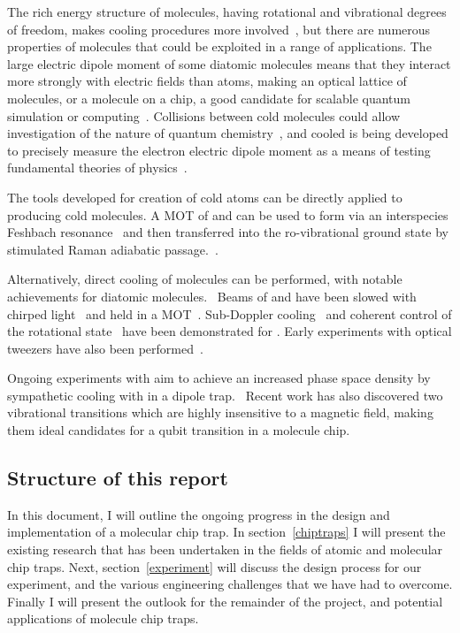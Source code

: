 The rich energy structure of molecules, having rotational and vibrational
degrees of freedom, makes cooling procedures more involved~\cite{Tarbutt2018},
but there are numerous properties of molecules that could be exploited in a
range of applications. The large electric dipole moment of some diatomic
molecules means that they interact more strongly with electric fields than
atoms, making an optical lattice of molecules, or a molecule on a chip, a good
candidate for scalable quantum simulation or computing~\cite{Micheli2006,
Andre2006}.  Collisions between cold molecules could allow investigation of the
nature of quantum chemistry~\cite{Krems2008}, and cooled \YbF{} is being
developed to precisely measure the electron electric dipole moment as a means of
testing fundamental theories of physics~\cite{Lim2018}.

The tools developed for creation of cold atoms can be directly applied to
producing cold molecules. A MOT of \esRb{} and \ottCs{} can be used to form
\RbCs{} via an interspecies Feshbach resonance~\cite{PhysRevA.85.032506,
PhysRevA.89.033604} and then transferred into the ro-vibrational ground state by
stimulated Raman adiabatic passage.~\cite{PhysRevLett.113.255301,
RevModPhys.70.1003}.

Alternatively, direct cooling of molecules can be performed, with notable
achievements for diatomic molecules.~\cite{Shuman2010} Beams of \SrF{} and
\CaF{} have been slowed with chirped light~\cite{PhysRevLett.108.103002,
Truppe2017a} and held in a MOT~\cite{Barry2014, Williams2017}. Sub-Doppler
cooling~\cite{Truppe2017} and coherent control of the rotational
state~\cite{Williams2018, Blackmore_2018} have been demonstrated for
\CaF{}. Early experiments with optical tweezers have also been
performed~\cite{Anderegg2019}.


Ongoing experiments with \CaF{} aim to achieve an increased phase space density by
sympathetic cooling with \esRb{} in a dipole trap.~ Recent
work has also discovered two vibrational transitions which are highly
insensitive to a magnetic field, making them ideal candidates for a qubit
transition in a molecule chip. 

\subsection{Structure of this report}

In this document, I will outline the ongoing progress in the design and
implementation of a molecular chip trap. In section~\ref{chiptraps} I will present
the existing research that has been undertaken in the fields of atomic and
molecular chip traps. Next, section~\ref{experiment} will discuss the design
process for our experiment, and the various engineering challenges that we have
had to overcome. Finally I will present the outlook for the remainder of the
project, and potential applications of molecule chip traps.
